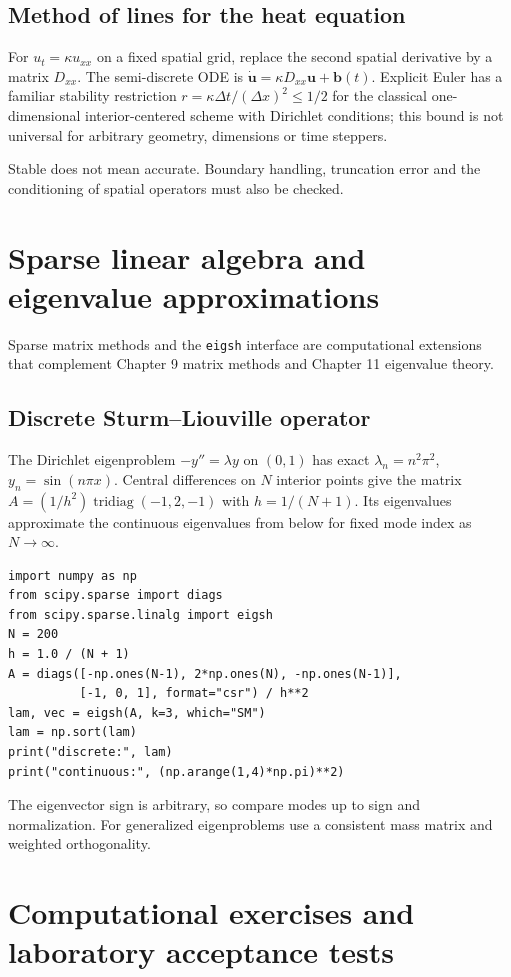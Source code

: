 \documentclass[11pt,letterpaper,oneside]{report}
\theoremstyle{definition}\newtheorem{definition}[theorem]{Definition}
\theoremstyle{remark}\newtheorem{remark}[theorem]{Remark}
\begin{document}
\section{Method of lines for the heat equation}
For $u_t=\kappa u_{xx}$ on a fixed spatial grid, replace the second spatial derivative by a matrix $D_{xx}$. The semi-discrete ODE is $\dot{\mathbf u}=\kappa D_{xx}\mathbf u+\mathbf b(t)$. Explicit Euler has a familiar stability restriction $r=\kappa\Delta t/(\Delta x)^2\le1/2$ for the classical one-dimensional interior-centered scheme with Dirichlet conditions; this bound is not universal for arbitrary geometry, dimensions or time steppers.
\begin{caution}Stable does not mean accurate. Boundary handling, truncation error and the conditioning of spatial operators must also be checked.\end{caution}
\chapter{Sparse linear algebra and eigenvalue approximations}
\begin{modern}Sparse matrix methods and the \texttt{eigsh} interface are computational extensions that complement Chapter 9 matrix methods and Chapter 11 eigenvalue theory.\end{modern}
\section{Discrete Sturm--Liouville operator}
The Dirichlet eigenproblem $-y''=\lambda y$ on $(0,1)$ has exact $\lambda_n=n^2\pi^2$, $y_n=\sin(n\pi x)$. Central differences on $N$ interior points give the matrix $A=(1/h^2)\operatorname{tridiag}(-1,2,-1)$ with $h=1/(N+1)$. Its eigenvalues approximate the continuous eigenvalues from below for fixed mode index as $N\to\infty$.
\begin{lstlisting}
import numpy as np
from scipy.sparse import diags
from scipy.sparse.linalg import eigsh
N = 200
h = 1.0 / (N + 1)
A = diags([-np.ones(N-1), 2*np.ones(N), -np.ones(N-1)],
          [-1, 0, 1], format="csr") / h**2
lam, vec = eigsh(A, k=3, which="SM")
lam = np.sort(lam)
print("discrete:", lam)
print("continuous:", (np.arange(1,4)*np.pi)**2)
\end{lstlisting}
The eigenvector sign is arbitrary, so compare modes up to sign and normalization. For generalized eigenproblems use a consistent mass matrix and weighted orthogonality.
\chapter{Computational exercises and laboratory acceptance tests}
\end{document}
